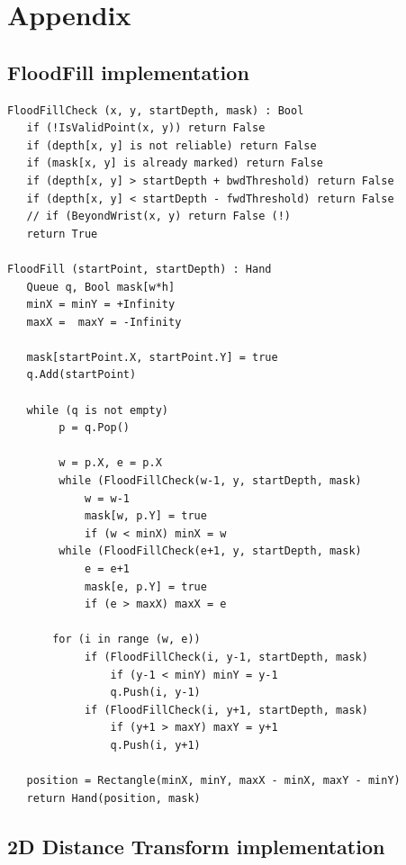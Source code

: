 \documentclass[a4paper,11pt,oneside]{article}
\begin{document}
\newpage

\section{Appendix}

\subsection{FloodFill implementation}

\begin{verbatim}
FloodFillCheck (x, y, startDepth, mask) : Bool
   if (!IsValidPoint(x, y)) return False
   if (depth[x, y] is not reliable) return False
   if (mask[x, y] is already marked) return False
   if (depth[x, y] > startDepth + bwdThreshold) return False
   if (depth[x, y] < startDepth - fwdThreshold) return False
   // if (BeyondWrist(x, y) return False (!)
   return True

FloodFill (startPoint, startDepth) : Hand
   Queue q, Bool mask[w*h]
   minX = minY = +Infinity
   maxX =  maxY = -Infinity

   mask[startPoint.X, startPoint.Y] = true
   q.Add(startPoint)

   while (q is not empty)
        p = q.Pop()

        w = p.X, e = p.X
        while (FloodFillCheck(w-1, y, startDepth, mask)
            w = w-1
            mask[w, p.Y] = true
            if (w < minX) minX = w
        while (FloodFillCheck(e+1, y, startDepth, mask)
            e = e+1
            mask[e, p.Y] = true
            if (e > maxX) maxX = e

       for (i in range (w, e)) 
            if (FloodFillCheck(i, y-1, startDepth, mask)
                if (y-1 < minY) minY = y-1
                q.Push(i, y-1)
            if (FloodFillCheck(i, y+1, startDepth, mask)
                if (y+1 > maxY) maxY = y+1
                q.Push(i, y+1)
   
   position = Rectangle(minX, minY, maxX - minX, maxY - minY)
   return Hand(position, mask)

\end{verbatim}


\newpage
\subsection{2D Distance Transform implementation}
\end{document}
